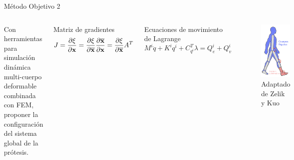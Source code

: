 \documentclass[10pt]{beamer}
\begin{document}
\begin{frame}{Método Objetivo 2}

\begin{columns}[t]


\column{60 mm}
\begin{block}
{\footnotesize{}Con herramientas para simulación dinámica multi-cuerpo deformable combinada con FEM, proponer la configuración del sistema global de la prótesis.}{\footnotesize \par}
\end{block}
\begin{block}{\scriptsize {Matriz de gradientes}}
\begin{equation}
J=\frac{\partial{\xi}}{\partial{\bf{x}}}=\frac{\partial{\xi}}{\partial{\bf{\overline{x}}}}\frac{\partial\bf{\overline{x}}}{\partial{\bf{x}}}=\frac{\partial{\xi}}{\partial{\bf{\overline{x}}}}A^{T}
\end{equation}
\end{block}
\begin{block}{\scriptsize {Ecuaciones de movimiento de Lagrange}}
\begin{equation}
M^{i}\ddot{q}+K^{i}q^{i}+C_{q^{i}}^{T}\lambda=Q_{e}^{i}+Q_{v}^{i}
\end{equation}
\end{block}


\column{60 mm}

\begin{figure}
\begin{centering}
\includegraphics[scale=0.44]{Feathergraphics/deformable}
\caption{Adaptado de Zelik y Kuo \cite{Zelik2010}}
\par\end{centering}

\end{figure}

\end{columns}

\end{frame}
\end{document}
